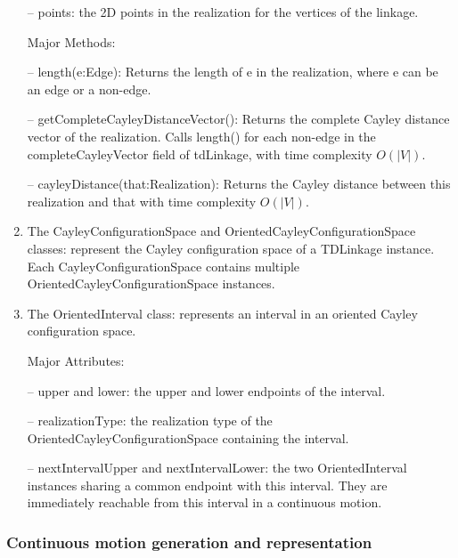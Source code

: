 \documentclass[10pt]{article}
\begin{document}
\begin{enumerate}
\noindent --  \textsf{points}:
the 2D points in the realization for the vertices of the linkage. 

\smallskip

\noindent Major Methods:

\noindent --  \textsf{length(e:Edge)}: 
Returns the length of \textsf{e} in the realization, where \textsf{e} can be an edge or a non-edge.

\noindent --  \textsf{getCompleteCayleyDistanceVector}(): 
Returns the complete Cayley distance vector of the realization.
Calls \textsf{length()} for each non-edge in the \textsf{completeCayleyVector} field of \textsf{tdLinkage}, with time complexity $O(|V|)$.

\noindent --  \textsf{cayleyDistance(that:Realization)}: 
Returns the Cayley distance \cite[Section 3.2]{sitharam2014beast} between this realization and \textsf{that} with time complexity $O(|V|)$.



\item The \textsf{CayleyConfigurationSpace} and \textsf{OrientedCayleyConfigurationSpace} classes: represent the Cayley configuration space of a \textsf{TDLinkage} instance. Each \textsf{CayleyConfigurationSpace} contains multiple \textsf{OrientedCayleyConfigurationSpace} instances. 

\item The \textsf{OrientedInterval} class: represents an interval in an oriented Cayley configuration space. 

\noindent Major Attributes:

\noindent -- \textsf{upper} and \textsf{lower}:
the upper and lower endpoints of the interval.

\noindent --  \textsf{realizationType}:
the realization type of the \textsf{OrientedCayleyConfigurationSpace} containing the interval.

\noindent --  \textsf{nextIntervalUpper} and \textsf{nextIntervalLower}:
the two \textsf{OrientedInterval} instances sharing a common endpoint with this interval. 
They are immediately reachable from this interval in a continuous motion.


\end{enumerate}



\subsubsection{Continuous motion generation and representation}
\end{document}
